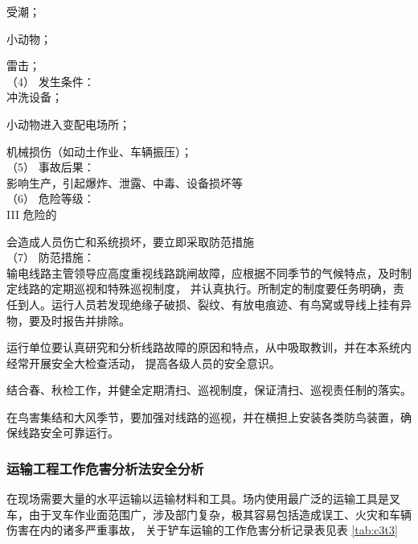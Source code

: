  受潮；

 小动物；

 雷击；\\

（4） 发生条件：\\

 冲洗设备；

 小动物进入变配电场所；

 机械损伤（如动土作业、车辆振压）；\\


（5） 事故后果：\\

影响生产，引起爆炸、泄露、中毒、设备损坏等\\

（6） 危险等级：\\

III 危险的

会造成人员伤亡和系统损坏，要立即采取防范措施\\

（7） 防范措施：\\

 输电线路主管领导应高度重视线路跳闸故障，应根据不同季节的气候特点，及时制定线路的定期巡视和特殊巡视制度，
并认真执行。所制定的制度要任务明确，责任到人。运行人员若发现绝缘子破损、裂纹、有放电痕迹、有鸟窝或导线上挂有异物，要及时报告并排除。 

 运行单位要认真研究和分析线路故障的原因和特点，从中吸取教训，并在本系统内经常开展安全大检查活动，
提高各级人员的安全意识。

 结合春、秋检工作，并健全定期清扫、巡视制度，保证清扫、巡视责任制的落实。

 在鸟害集结和大风季节，要加强对线路的巡视，并在横担上安装各类防鸟装置，确保线路安全可靠运行。

\subsubsection{运输工程工作危害分析法安全分析}

在现场需要大量的水平运输以运输材料和工具。场内使用最广泛的运输工具是叉车，由于叉车作业面范围广，涉及部门复杂，极其容易包括造成误工、火灾和车辆伤害在内的诸多严重事故，
关于铲车运输的工作危害分析记录表见表 \ref{tab:c3t3}

